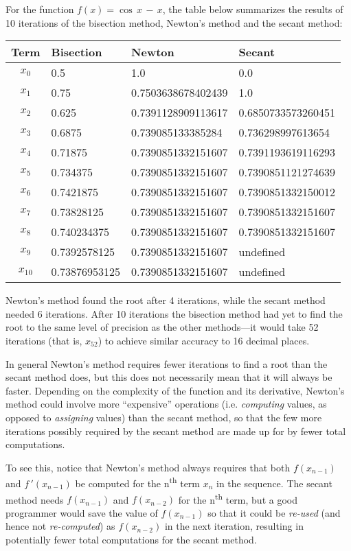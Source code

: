For the function $f(x) = \cos\,x \,-\, x$, the table below summarizes the
results of 10 iterations of the bisection method, Newton's method and the
secant method:

\begin{center}
\begin{tabular}{c||l|l|l}
Term & Bisection & Newton & Secant\\
\hline
$x_0$ & 0.5 & 1.0 & 0.0\\
$x_1$ & 0.75 & 0.7503638678402439 & 1.0\\
$x_2$ & 0.625 & 0.7391128909113617 & 0.6850733573260451\\
$x_3$ & 0.6875 & 0.739085133385284 & 0.736298997613654\\
$x_4$ & 0.71875 & 0.7390851332151607 & 0.7391193619116293\\
$x_5$ & 0.734375 & 0.7390851332151607 & 0.7390851121274639\\
$x_6$ & 0.7421875 & 0.7390851332151607 & 0.7390851332150012\\
$x_7$ & 0.73828125 & 0.7390851332151607 & 0.7390851332151607\\
$x_8$ & 0.740234375 & 0.7390851332151607 & 0.7390851332151607\\
$x_9$ & 0.7392578125 & 0.7390851332151607 & undefined\\
$x_{10}$ & 0.73876953125 & 0.7390851332151607 & undefined
\end{tabular}
\end{center}
Newton's method found the root after 4 iterations, while the secant method
needed 6 iterations. After 10 iterations the bisection method had yet to find
the root to the same level of precision as the other methods---it would take 52
iterations (that is, $x_{52}$) to achieve similar accuracy to 16 decimal places.

In general Newton's method requires fewer iterations to find a root than the
secant method does, but this does not necessarily mean that it will always be
faster. Depending on the complexity of the function and its derivative, Newton's
method could involve more ``expensive'' operations (i.e. \emph{computing}
values, as opposed to \emph{assigning} values) than the secant method, so that
the few more iterations possibly required by the secant method are made up for
by fewer total computations.

To see this, notice that Newton's method always requires that both $f(x_{n-1})$
and $f\,'(x_{n-1})$ be computed for the n\textsuperscript{th} term $x_n$ in the
sequence. The secant method needs $f(x_{n-1})$ and $f(x_{n-2})$ for the
n\textsuperscript{th} term, but a good programmer would save the value of
$f(x_{n-1})$ so that it could be \emph{re-used} (and hence not
\emph{re-computed}) as $f(x_{n-2})$ in the next iteration, resulting in
potentially fewer total computations for the secant method.

